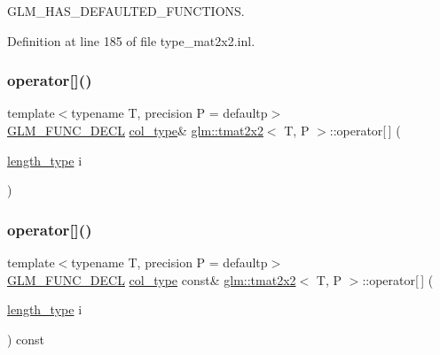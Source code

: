 G\+L\+M\+\_\+\+H\+A\+S\+\_\+\+D\+E\+F\+A\+U\+L\+T\+E\+D\+\_\+\+F\+U\+N\+C\+T\+I\+O\+NS. 



Definition at line 185 of file type\+\_\+mat2x2.\+inl.

\mbox{\label{structglm_1_1tmat2x2_ae9e51d1d6b2d5f3ed9e42da1945b7998}} 
\subsubsection{\texorpdfstring{operator[]()}{operator[]()}\hspace{0.1cm}{\footnotesize\ttfamily [1/2]}}
{\footnotesize\ttfamily template$<$typename T, precision P = defaultp$>$ \\
\mbox{\hyperlink{setup_8hpp_ab2d052de21a70539923e9bcbf6e83a51}{G\+L\+M\+\_\+\+F\+U\+N\+C\+\_\+\+D\+E\+CL}} \mbox{\hyperlink{structglm_1_1tmat2x2_a9e4690f52926b475b36ed5f6209f22f4}{col\+\_\+type}}\& \mbox{\hyperlink{structglm_1_1tmat2x2}{glm\+::tmat2x2}}$<$ T, P $>$\+::operator\mbox{[}$\,$\mbox{]} (\begin{DoxyParamCaption}\item[{\mbox{\hyperlink{structglm_1_1tmat2x2_a89bfd406715f8c3ae1c1f503d640fbb6}{length\+\_\+type}}}]{i }\end{DoxyParamCaption})}

\mbox{\label{structglm_1_1tmat2x2_a87ea7b7b3dc1e2a6d906942e73bbf72c}} 
\subsubsection{\texorpdfstring{operator[]()}{operator[]()}\hspace{0.1cm}{\footnotesize\ttfamily [2/2]}}
{\footnotesize\ttfamily template$<$typename T, precision P = defaultp$>$ \\
\mbox{\hyperlink{setup_8hpp_ab2d052de21a70539923e9bcbf6e83a51}{G\+L\+M\+\_\+\+F\+U\+N\+C\+\_\+\+D\+E\+CL}} \mbox{\hyperlink{structglm_1_1tmat2x2_a9e4690f52926b475b36ed5f6209f22f4}{col\+\_\+type}} const\& \mbox{\hyperlink{structglm_1_1tmat2x2}{glm\+::tmat2x2}}$<$ T, P $>$\+::operator\mbox{[}$\,$\mbox{]} (\begin{DoxyParamCaption}\item[{\mbox{\hyperlink{structglm_1_1tmat2x2_a89bfd406715f8c3ae1c1f503d640fbb6}{length\+\_\+type}}}]{i }\end{DoxyParamCaption}) const}



